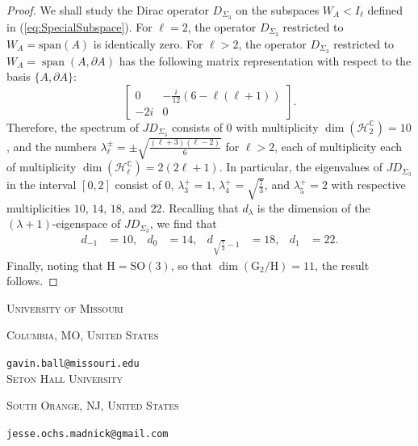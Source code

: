 \documentclass[11pt]{article}
\makeatletter
\newcommand{\SO}{\mathrm{SO}}
\newcommand{\G}{\mathrm{G}}
\newcommand{\C}{\mathbb{C}}
\newcommand{\Hc}{\mathcal{H}}
\theoremstyle{definition}
\numberwithin{equation}{section}
\newcommand{\Addresses}
{{  \bigskip
\noindent	\textsc{University of Missouri} \par\nopagebreak
\noindent	\textsc{Columbia, MO, United States} \par\nopagebreak
\noindent	\texttt{gavin.ball@missouri.edu} \\

\medskip
\noindent	\textsc{Seton Hall University} \par\nopagebreak
\noindent	\textsc{South Orange, NJ, United States} \par\nopagebreak
\noindent	\texttt{jesse.ochs.madnick@gmail.com} \\
}}
\makeatother
\begin{document}
\begin{proof} We shall study the Dirac operator $D_{\Sigma_3}$ on the subspaces $W_A < I_\ell$ defined in (\ref{eq:SpecialSubspace}).  For $\ell = 2$, the operator $D_{\Sigma_3}$ restricted to $W_A = \mathrm{span}(A)$ is identically zero.  For $\ell > 2$, the operator $D_{\Sigma_3}$ restricted to $W_A = \operatorname{span}(A, \partial A)$ has the following matrix representation with respect to the basis $\{A, \partial A\}$:
\begin{equation*}
    \begin{bmatrix}
        0 & -\tfrac{i}{12}(6 - \ell(\ell+1)) \\
        -2i & 0
    \end{bmatrix}\!.
\end{equation*}
Therefore, the spectrum of $J D_{\Sigma_3}$ consists of $0$ with multiplicity $\dim(\Hc_2^\C) = 10$, and the numbers $ \lambda^{\pm}_{\ell} = \pm\sqrt{\frac{(\ell+3)(\ell-2)}{6}}$ for $\ell > 2$, each of multiplicity each of multiplicity $\dim(\Hc_\ell^\C) = 2(2\ell+1)$.  In particular, the eigenvalues of $JD_{\Sigma_3}$ in the interval $[0,2]$ consist of $0$, $\lambda_3^+ = 1$, $\lambda_4^+ = \sqrt{\frac{7}{3}}$, and $\lambda_5^+ = 2$ with respective multiplicities $10$, $14$, $18$, and $22$.  Recalling that $d_\lambda$ is the dimension of the $(\lambda+1)$-eigenspace of $JD_{\Sigma_3}$, we find that
\begin{align*}
d_{-1} & = 10, & d_0 & = 14, & d_{\sqrt{\frac{7}{3}} - 1} & = 18, & d_1 & = 22.
\end{align*}
Finally, noting that $\mathrm{H} = \SO(3)$, so that $\dim(\G_2/\mathrm{H}) = 11$, the result follows.

\end{proof}



\Addresses
\end{document}
